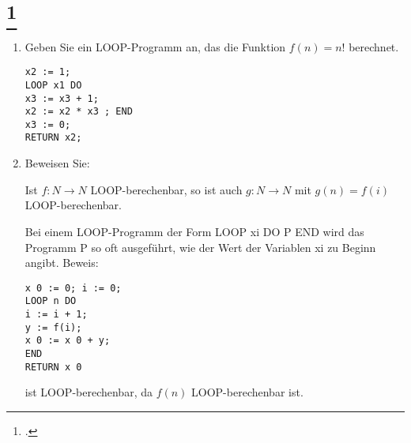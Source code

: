 \documentclass{lehramt-informatik-aufgabe}
\begin{document}
\section{
\footcite[Aufgabe 1]{theo:ab:4}}

\begin{enumerate}

%

\item Geben Sie ein LOOP-Programm an, das die Funktion $f(n) = n!$
berechnet.

\begin{liAntwort}
\begin{verbatim}
x2 := 1;
LOOP x1 DO
x3 := x3 + 1;
x2 := x2 * x3 ; END
x3 := 0;
RETURN x2;
\end{verbatim}
\end{liAntwort}


\item

Beweisen Sie:

Ist $f : N \rightarrow N$ LOOP-berechenbar, so ist auch
$g : N \rightarrow N$ mit $g(n) = f (i)$
LOOP-berechenbar.

\begin{liAntwort}
Bei einem LOOP-Programm der Form LOOP xi DO P END wird das Programm P so
oft ausgeführt, wie der Wert der Variablen xi zu Beginn angibt. Beweis:

\begin{verbatim}
x 0 := 0; i := 0;
LOOP n DO
i := i + 1;
y := f(i);
x 0 := x 0 + y;
END
RETURN x 0
\end{verbatim}

ist LOOP-berechenbar, da $f (n)$ LOOP-berechenbar ist.
\end{liAntwort}

\end{enumerate}
\end{document}
